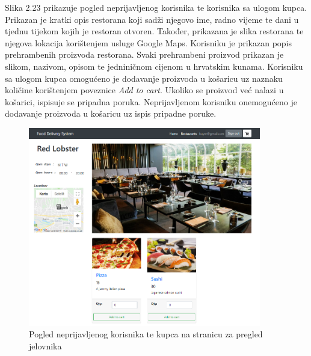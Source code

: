 \documentclass[times, utf8, zavrsni, numeric]{fer}
\begin{document}
Slika 2.23 prikazuje pogled neprijavljenog korisnika te korisnika sa ulogom kupca. Prikazan je kratki opis restorana koji sadži njegovo ime, radno vijeme te dani u tjednu tijekom kojih je restoran otvoren. Također, prikazana je slika restorana te njegova lokacija korištenjem usluge Google Maps. Korisniku je prikazan popis prehrambenih proizvoda restorana. Svaki prehrambeni proizvod prikazan je slikom, nazivom, opisom te jedniničnom cijenom u hrvatskim kunama. Korisniku sa ulogom kupca omogućeno je dodavanje proizvoda u košaricu uz naznaku količine korištenjem poveznice \emph{Add to cart}. Ukoliko se proizvod već nalazi u košarici, ispisuje se pripadna poruka. Neprijavljenom korisniku onemogućeno je dodavanje proizvoda u košaricu uz ispis pripadne poruke.
\begin{figure}[htb]
\centering
\includegraphics[height=8.7cm]{jelovnik.png}
\caption{Pogled neprijavljenog korisnika te kupca na stranicu za pregled jelovnika}
\label{fig:rrRest}
\end{figure}
\end{document}

